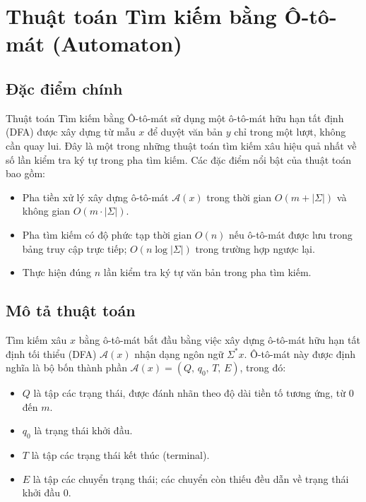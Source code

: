 \section{Thuật toán Tìm kiếm bằng Ô-tô-mát (Automaton)}

\subsection{Đặc điểm chính}

Thuật toán Tìm kiếm bằng Ô-tô-mát sử dụng một ô-tô-mát hữu hạn tất định
(DFA) được xây dựng từ mẫu $x$ để duyệt văn bản $y$ chỉ trong một lượt,
không cần quay lui. Đây là một trong những thuật toán tìm kiếm xâu hiệu
quả nhất về số lần kiểm tra ký tự trong pha tìm kiếm. Các đặc điểm nổi
bật của thuật toán bao gồm:

\begin{itemize}
    \item Pha tiền xử lý xây dựng ô-tô-mát $\mathcal{A}(x)$ trong thời gian
          $O(m + |\Sigma|)$ và không gian $O(m \cdot |\Sigma|)$.
    \item Pha tìm kiếm có độ phức tạp thời gian $O(n)$ nếu ô-tô-mát được
          lưu trong bảng truy cập trực tiếp; $O(n \log |\Sigma|)$ trong
          trường hợp ngược lại.
    \item Thực hiện đúng $n$ lần kiểm tra ký tự văn bản trong pha tìm kiếm.
\end{itemize}

\subsection{Mô tả thuật toán}

Tìm kiếm xâu $x$ bằng ô-tô-mát bắt đầu bằng việc xây dựng ô-tô-mát hữu
hạn tất định tối thiểu (DFA) $\mathcal{A}(x)$ nhận dạng ngôn ngữ
$\Sigma^{*}x$. Ô-tô-mát này được định nghĩa là bộ bốn thành phần
$\mathcal{A}(x) = (Q,\, q_0,\, T,\, E)$, trong đó:

\begin{itemize}
    \item $Q$ là tập các trạng thái, được đánh nhãn theo độ dài tiền tố
          tương ứng, từ $0$ đến $m$.
    \item $q_0$ là trạng thái khởi đầu.
    \item $T$ là tập các trạng thái kết thúc (terminal).
    \item $E$ là tập các chuyển trạng thái; các chuyển còn thiếu đều dẫn
          về trạng thái khởi đầu $0$.
\end{itemize}


